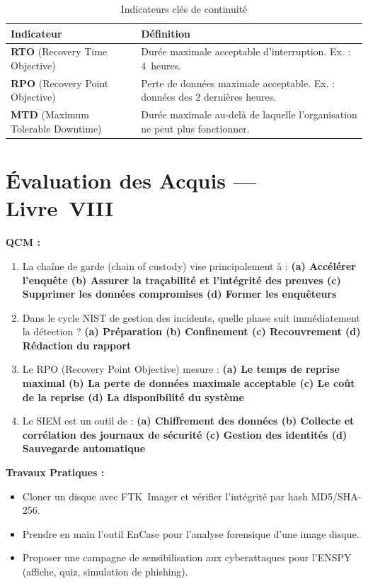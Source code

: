 \begin{table}[H]
\centering
\small
\begin{tabular}{p{3cm}p{8.5cm}}
    \toprule
    \textbf{Indicateur} & \textbf{Définition} \\
    \midrule
    \textbf{RTO} (Recovery Time Objective)  & Durée maximale acceptable d'interruption. Ex. : 4~heures. \\
    \textbf{RPO} (Recovery Point Objective) & Perte de données maximale acceptable. Ex. : données des 2 dernières heures. \\
    \textbf{MTD} (Maximum Tolerable Downtime) & Durée maximale au-delà de laquelle l'organisation ne peut plus fonctionner. \\
    \bottomrule
\end{tabular}
\caption{Indicateurs clés de continuité}
\end{table}

\section{Évaluation des Acquis --- Livre~VIII}

\begin{boxexo}
\textbf{QCM :}
\begin{enumerate}
    \item La chaîne de garde (chain of custody) vise principalement à : \textbf{(a) Accélérer l'enquête \quad (b) Assurer la traçabilité et l'intégrité des preuves \quad (c) Supprimer les données compromises \quad (d) Former les enquêteurs}
    \item Dans le cycle NIST de gestion des incidents, quelle phase suit immédiatement la détection ? \textbf{(a) Préparation \quad (b) Confinement \quad (c) Recouvrement \quad (d) Rédaction du rapport}
    \item Le RPO (Recovery Point Objective) mesure : \textbf{(a) Le temps de reprise maximal \quad (b) La perte de données maximale acceptable \quad (c) Le coût de la reprise \quad (d) La disponibilité du système}
    \item Le SIEM est un outil de : \textbf{(a) Chiffrement des données \quad (b) Collecte et corrélation des journaux de sécurité \quad (c) Gestion des identités \quad (d) Sauvegarde automatique}
\end{enumerate}

\textbf{Travaux Pratiques :}
\begin{itemize}
    \item Cloner un disque avec FTK~Imager et vérifier l'intégrité par hash MD5/SHA-256.
    \item Prendre en main l'outil EnCase pour l'analyse forensique d'une image disque.
    \item Proposer une campagne de sensibilisation aux cyberattaques pour l'ENSPY (affiche, quiz, simulation de phishing).
\end{itemize}
\end{boxexo}
